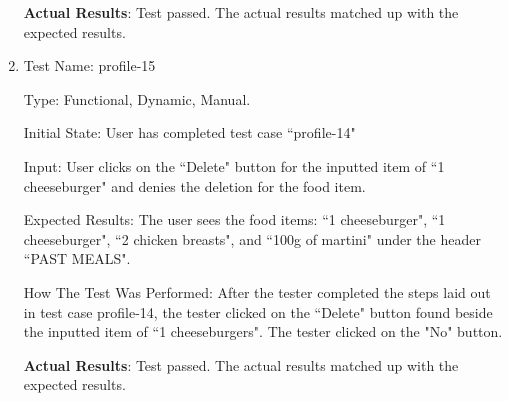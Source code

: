 \documentclass[12pt, titlepage]{article}
\begin{document}
\begin{enumerate}
		\textbf{Actual Results}: Test passed. The actual results matched up with the expected results.
		
		\item{Test Name: profile-15}
		
		Type: Functional, Dynamic, Manual.
		
		Initial State: User has completed test case ``profile-14"
		
		Input: User clicks on the ``Delete" button for the inputted item of ``1 cheeseburger" and denies the deletion for the food item.
		
		Expected Results: The user sees the food items: ``1 cheeseburger", ``1 cheeseburger", ``2 chicken breasts", and ``100g of martini" under the header ``PAST MEALS".
		
		How The Test Was Performed: After the tester completed the steps laid out in test case profile-14, the tester clicked on the ``Delete" button found beside the inputted item of ``1 cheeseburgers". The tester clicked on the "No" button.
		
		\textbf{Actual Results}: Test passed. The actual results matched up with the expected results.

	\end{enumerate}
\end{document}
